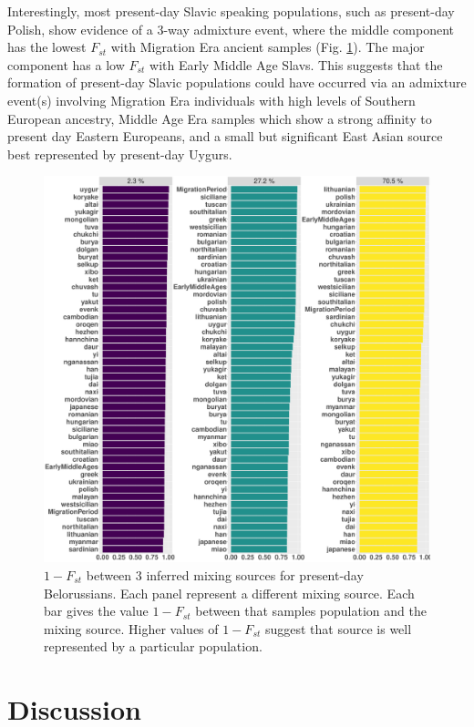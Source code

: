 Interestingly, most present-day Slavic speaking populations, such as present-day Polish, show evidence of a 3-way admixture event, where the middle component has the lowest $F_{st}$ with Migration Era ancient samples (Fig. \ref{fig:Fst_plot_HB:lithuanian}). The major component has a low $F_{st}$ with Early Middle Age Slavs. This suggests that the formation of present-day Slavic populations could have occurred via an admixture event(s) involving Migration Era individuals with high levels of Southern European ancestry, Middle Age Era samples which show a strong affinity to present day Eastern Europeans, and a small but significant East Asian source best represented by present-day Uygurs. 


\begin{figure}[htp]
    \centering
    \includegraphics[width=1.0\textwidth]{../images/chapter5/Fst_plot_HB:belorussian.pdf}
    \caption{$1 - F_{st}$ between 3 inferred mixing sources for present-day Belorussians. Each panel represent a different mixing source. Each bar gives the value $1-F_{st}$ between that samples population and the mixing source. Higher values of $1-F_{st}$ suggest that source is well represented by a particular population. }
    \label{fig:Fst_plot_HB:lithuanian}
\end{figure} 

\section{Discussion}

